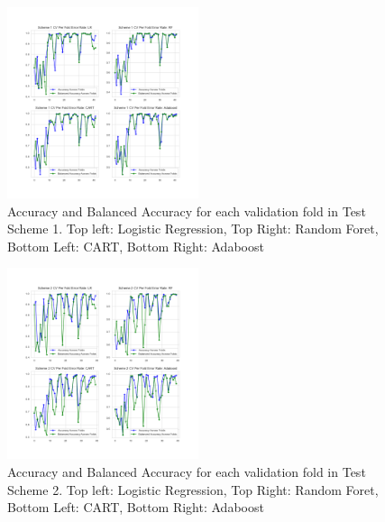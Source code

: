 \documentclass[11pt, letterpaper, journal]{IEEEtran}
\begin{document}
\begin{table}
\begin{center}
\caption{CV and test set results for the 4 models under test scheme 2}
\label{tab:scheme2_results}
\end{center}
\end{table}

\begin{figure}[h]
\centering
\includegraphics[width=0.5\textwidth]{statics/test_Scheme_1_Fold_error.png}
\caption{Accuracy and Balanced Accuracy for each validation fold in Test Scheme 1. Top left: Logistic Regression, Top Right: Random Foret, Bottom Left: CART, Bottom Right: Adaboost}
\label{fig:fold_results_1}
\end{figure}

\begin{figure}[h]
\centering
\includegraphics[width=0.5\textwidth]{statics/test_Scheme2_fold_error.png}
\caption{Accuracy and Balanced Accuracy for each validation fold in Test Scheme 2. Top left: Logistic Regression, Top Right: Random Foret, Bottom Left: CART, Bottom Right: Adaboost}
\label{fig:fold_results_2}
\end{figure}
\end{document}
